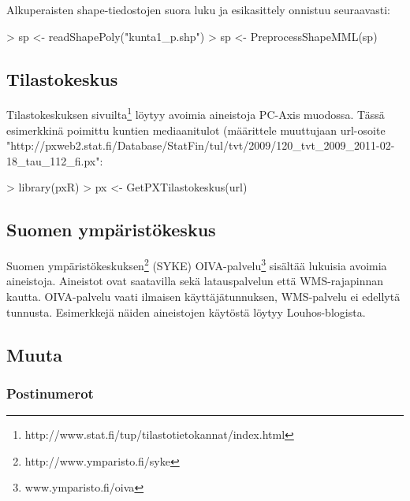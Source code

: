 \documentclass[a4paper,finnish]{article}
\begin{document}

Alkuperaisten shape-tiedostojen suora luku ja esikasittely onnistuu
seuraavasti:

\begin{Schunk}
\begin{Sinput}
> sp <- readShapePoly("kunta1_p.shp")
> sp <- PreprocessShapeMML(sp)      
\end{Sinput}
\end{Schunk}

\subsection{Tilastokeskus}

Tilastokeskuksen
sivuilta\footnote{http://www.stat.fi/tup/tilastotietokannat/index.html}
löytyy avoimia aineistoja PC-Axis muodossa. Tässä esimerkkinä poimittu
kuntien mediaanitulot (määrittele muuttujaan url-osoite
"http://pxweb2.stat.fi/Database/StatFin/tul/tvt/2009/120\_tvt\_2009\_2011-02-18\_tau\_112\_fi.px":

\begin{Schunk}
\begin{Sinput}
> library(pxR)
> px <- GetPXTilastokeskus(url)
\end{Sinput}
\end{Schunk}

\subsection{Suomen ympäristökeskus}

Suomen ympäristökeskuksen\footnote{http://www.ymparisto.fi/syke}
(SYKE) OIVA-palvelu\footnote{www.ymparisto.fi/oiva} sisältää lukuisia
avoimia aineistoja. Aineistot ovat saatavilla sekä latauspalvelun että
WMS-rajapinnan kautta. OIVA-palvelu vaati ilmaisen käyttäjätunnuksen,
WMS-palvelu ei edellytä tunnusta. Esimerkkejä näiden aineistojen
käytöstä löytyy Louhos-blogista.

\subsection{Muuta}

\subsubsection{Postinumerot}
\end{document}

